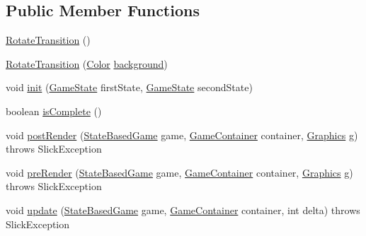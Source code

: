 \subsection*{Public Member Functions}
\begin{DoxyCompactItemize}
\item 
\mbox{\hyperlink{classorg_1_1newdawn_1_1slick_1_1state_1_1transition_1_1_rotate_transition_a83af1aebc17f3fc3433ae2802b46dc7c}{Rotate\+Transition}} ()
\item 
\mbox{\hyperlink{classorg_1_1newdawn_1_1slick_1_1state_1_1transition_1_1_rotate_transition_aefa7546ffe542346a0ca65349381651e}{Rotate\+Transition}} (\mbox{\hyperlink{classorg_1_1newdawn_1_1slick_1_1_color}{Color}} \mbox{\hyperlink{classorg_1_1newdawn_1_1slick_1_1state_1_1transition_1_1_rotate_transition_a8ab02534f280fe5883c5348a1eb399b2}{background}})
\item 
void \mbox{\hyperlink{classorg_1_1newdawn_1_1slick_1_1state_1_1transition_1_1_rotate_transition_a527c48345f18db529a56719c5647bd94}{init}} (\mbox{\hyperlink{interfaceorg_1_1newdawn_1_1slick_1_1state_1_1_game_state}{Game\+State}} first\+State, \mbox{\hyperlink{interfaceorg_1_1newdawn_1_1slick_1_1state_1_1_game_state}{Game\+State}} second\+State)
\item 
boolean \mbox{\hyperlink{classorg_1_1newdawn_1_1slick_1_1state_1_1transition_1_1_rotate_transition_a08722d7a235f796e69e77c5e665ab3e5}{is\+Complete}} ()
\item 
void \mbox{\hyperlink{classorg_1_1newdawn_1_1slick_1_1state_1_1transition_1_1_rotate_transition_aff86fd0d40fff8a2c1c126dc9ddba04e}{post\+Render}} (\mbox{\hyperlink{classorg_1_1newdawn_1_1slick_1_1state_1_1_state_based_game}{State\+Based\+Game}} game, \mbox{\hyperlink{classorg_1_1newdawn_1_1slick_1_1_game_container}{Game\+Container}} container, \mbox{\hyperlink{classorg_1_1newdawn_1_1slick_1_1_graphics}{Graphics}} g)  throws Slick\+Exception 
\item 
void \mbox{\hyperlink{classorg_1_1newdawn_1_1slick_1_1state_1_1transition_1_1_rotate_transition_aac26c3811fc2aab9c291e5323bd4adab}{pre\+Render}} (\mbox{\hyperlink{classorg_1_1newdawn_1_1slick_1_1state_1_1_state_based_game}{State\+Based\+Game}} game, \mbox{\hyperlink{classorg_1_1newdawn_1_1slick_1_1_game_container}{Game\+Container}} container, \mbox{\hyperlink{classorg_1_1newdawn_1_1slick_1_1_graphics}{Graphics}} g)  throws Slick\+Exception 
\item 
void \mbox{\hyperlink{classorg_1_1newdawn_1_1slick_1_1state_1_1transition_1_1_rotate_transition_a9e3f2c191f7f04925f8319b1e85a29f8}{update}} (\mbox{\hyperlink{classorg_1_1newdawn_1_1slick_1_1state_1_1_state_based_game}{State\+Based\+Game}} game, \mbox{\hyperlink{classorg_1_1newdawn_1_1slick_1_1_game_container}{Game\+Container}} container, int delta)  throws Slick\+Exception 
\end{DoxyCompactItemize}
